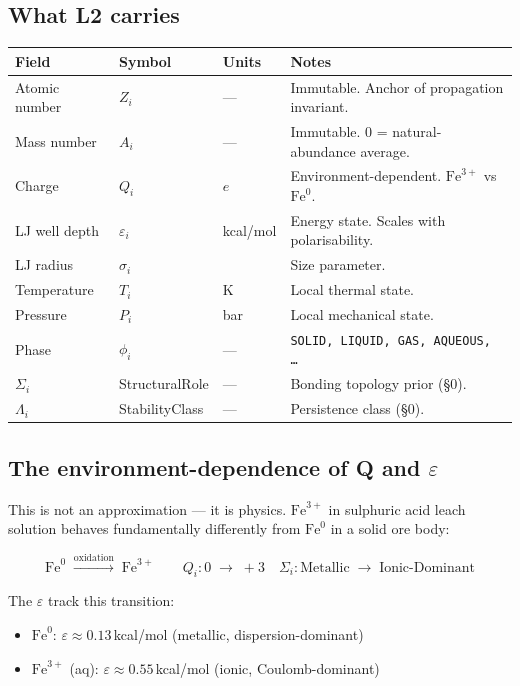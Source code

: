 \documentclass[11pt, a4paper, oneside]{article}
\theoremstyle{definition}
\newcommand{\Ang}{\text{\AA}}
\begin{document}
\subsection{What L2 carries}

\begin{center}
\begin{tabular}{llll}
\toprule
Field & Symbol & Units & Notes \\
\midrule
Atomic number & $Z_i$ & — & Immutable. Anchor of propagation invariant. \\
Mass number   & $A_i$ & — & Immutable. 0 = natural-abundance average. \\
Charge        & $Q_i$ & $e$ & Environment-dependent. $\mathrm{Fe}^{3+}$ vs $\mathrm{Fe}^0$. \\
LJ well depth & $\varepsilon_i$ & kcal/mol & Energy state. Scales with polarisability. \\
LJ radius     & $\sigma_i$ & \Ang & Size parameter. \\
Temperature   & $T_i$ & K & Local thermal state. \\
Pressure      & $P_i$ & bar & Local mechanical state. \\
Phase         & $\phi_i$ & — & \texttt{SOLID, LIQUID, GAS, AQUEOUS, \ldots} \\
\midrule
$\Sigma_i$ & StructuralRole & — & Bonding topology prior (§0). \\
$\Lambda_i$ & StabilityClass & — & Persistence class (§0). \\
\bottomrule
\end{tabular}
\end{center}

\subsection{The environment-dependence of Q and $\varepsilon$}

This is not an approximation — it is physics.
$\mathrm{Fe}^{3+}$ in sulphuric acid leach solution behaves fundamentally
differently from $\mathrm{Fe}^0$ in a solid ore body:

\begin{equation}
  \mathrm{Fe}^0 \;\xrightarrow{\text{oxidation}}\; \mathrm{Fe}^{3+}
  \qquad
  Q_i: 0 \;\to\; +3
  \quad
  \Sigma_i: \text{Metallic} \;\to\; \text{Ionic-Dominant}
  \label{eq:fe-oxidation}
\end{equation}

The $\varepsilon$ track this transition:
\begin{itemize}
  \item $\mathrm{Fe}^0$: $\varepsilon \approx 0.13$\,kcal/mol (metallic, dispersion-dominant)
  \item $\mathrm{Fe}^{3+}$ (aq): $\varepsilon \approx 0.55$\,kcal/mol (ionic, Coulomb-dominant)
\end{itemize}
\end{document}
